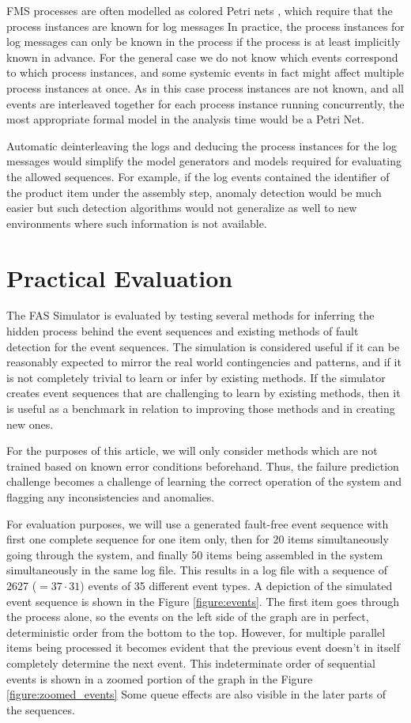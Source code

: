 \documentclass[journal]{IEEEtran}
\begin{document}
FMS processes are often modelled as colored Petri nets \cite{saitou2002robust}, which require that the process instances are known for log messages
In practice, the process instances for log messages can only be known in the process
if the process is at least implicitly known in advance. For the general case we do not know which events correspond to which process instances, and some systemic events
in fact might affect multiple process instances at once. As in this
case process instances are not known, and all events are interleaved together for each process instance running concurrently, the most appropriate formal
model in the analysis time would be a Petri Net.

Automatic deinterleaving the logs and deducing the process instances for the log messages would simplify the model generators and models required
for evaluating the allowed sequences.
For example, if the log events contained the identifier of the product
item under the assembly step, anomaly detection would be much easier but such detection algorithms would not generalize as well
to new environments where such information is not available.

\section{Practical Evaluation}

The FAS Simulator is evaluated by testing several methods for inferring the hidden process behind the event sequences and existing methods of fault detection for
the event sequences.
The simulation is considered useful if it can be reasonably expected to mirror the real world contingencies and patterns, and if it is not completely trivial to
learn or infer by existing methods. If the simulator creates event sequences that are challenging to learn by existing methods, then it is useful as a benchmark
in relation to improving those methods and in creating new ones.

For the purposes of this article, we will only consider methods which are not trained based on known error conditions beforehand. Thus, the failure prediction challenge
becomes a challenge of learning the correct operation of the system and flagging any inconsistencies and anomalies.

For evaluation purposes, we will use a generated fault-free event sequence with first one complete sequence for one item only, then for 20 items simultaneously going through the system,
and finally 50 items being assembled in the system simultaneously in the same log file. This results in a log file with a sequence of 2627 ($ = 37 \cdot 31 $) events of 35 different
event types. A depiction of the simulated event sequence is shown in the Figure \ref{figure:events}. The first item goes through the process alone, so the events on the left side
of the graph are in perfect, deterministic order from the bottom to the top. However, for multiple parallel items being processed it becomes evident that the previous event doesn't in itself
completely determine the next event. This indeterminate order of sequential events is shown in a zoomed portion of the graph in the Figure \ref{figure:zoomed_events}
Some queue effects are also visible in the later parts of the sequences.
\end{document}
